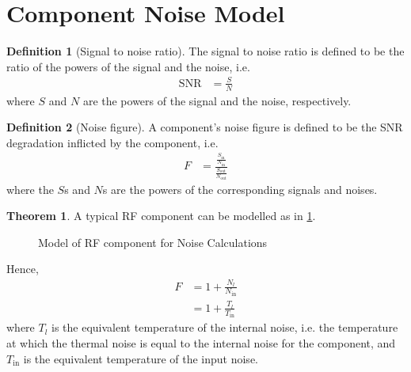 \documentclass[titlepage, fleqn, a4paper, 12pt, twoside]{article}
\theoremstyle{definition}
\newtheorem{definition}{Definition}
\theoremstyle{theorem}
\newtheorem{theorem}{Theorem}
\DeclareMathOperator{\SNR}{\mathrm{SNR}}
\begin{document}
\section{Component Noise Model}

\begin{definition}[Signal to noise ratio]
	The signal to noise ratio is defined to be the ratio of the powers of the signal and the noise, i.e.
	\begin{align*}
		\SNR &= \frac{S}{N}
	\end{align*}
	where $S$ and $N$ are the powers of the signal and the noise, respectively.
\end{definition}

\begin{definition}[Noise figure]
	A component's noise figure is defined to be the SNR degradation inflicted by the component, i.e.
	\begin{align*}
		F &= \frac{\frac{S_{\text{in}}}{N_{\text{in}}}}{\frac{S_{\text{out}}}{N_{\text{out}}}}
	\end{align*}
	where the $S$s and $N$s are the powers of the corresponding signals and noises.
\end{definition}

\begin{theorem}
	A typical RF component can be modelled as in \cref{fig:model_of_RF_component_for_noise_calculations}.
	\begin{figure}[H]
		\centering
		\caption{Model of RF component for Noise Calculations}
		\label{fig:model_of_RF_component_for_noise_calculations}
	\end{figure}
	Hence,
	\begin{align*}
		F &= 1 + \frac{N_l}{N_{\text{in}}}\\
		&= 1 + \frac{T_l}{T_{\text{in}}}
	\end{align*}
	where $T_l$ is the equivalent temperature of the internal noise, i.e. the temperature at which the thermal noise is equal to the internal noise for the component, and $T_{\text{in}}$ is the equivalent temperature of the input noise.
\end{theorem}
\end{document}
